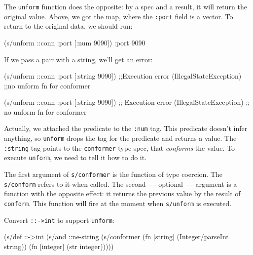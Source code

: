 
The \verb|unform| function does the opposite: by a spec and a result, it will return the original value. Above, we got the map, where the \verb|:port| field is a vector. To return to the original data, we should run:

\begin{english}
  \begin{clojure}
(s/unform ::conn {:port [:num 9090]})
{:port 9090}
  \end{clojure}
\end{english}

\noindent
If we pass a pair with a string, we'll get an error:

\ifx\DEVICETYPE\MOBILE

\begin{english}
  \begin{clojure}
(s/unform ::conn {:port [:string 9090]})
;;Execution error (IllegalStateException)
;;no unform fn for conformer
  \end{clojure}
\end{english}

\else

\begin{english}
  \begin{clojure}
(s/unform ::conn {:port [:string 9090]})
;; Execution error (IllegalStateException)
;; no unform fn for conformer
  \end{clojure}
\end{english}

\fi

Actually, we attached the predicate to the \verb|:num| tag. This predicate doesn't infer anything, so \verb|unform| drops the tag for the predicate and returns a value. The \verb|:string| tag points to the \verb|conformer| type spec, that \emph{conforms} the value. To execute \verb|unform|, we need to tell it how to do it.


The first argument of \verb|s/conformer| is the function of type coercion. The \verb|s/conform| refers to it when called. The second~--- optional~--- argument is a function with the opposite effect: it returns the previous value by the result of \verb|conform|. This function will fire at the moment when \verb|s/unform| is executed.

Convert \verb|::->int| to support \verb|unform|:

\begin{english}
  \begin{clojure}
(s/def ::->int
  (s/and
   ::ne-string
   (s/conformer
    (fn [string]
      (Integer/parseInt string))
    (fn [integer]
      (str integer)))))
  \end{clojure}
\end{english}

